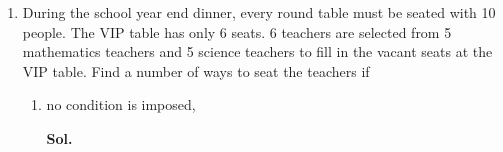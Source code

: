 \documentclass{report}
\newcommand\comb[2][^n]{{}_{#1}C_{#2}}
\newcommand{\sol}[1]{

      \noindent \textbf{Sol.}
}
\def\eos{\quad\hbox{\rlap{\hbox{\vrule depth 1.5pt height 2.6mm width 0.2mm \hskip 1mm \vrule height 2.6mm width 0.2mm}}{\vbox{\hrule height 0.2mm width 1.4mm \vskip 2.8mm \hrule depth 1.5pt height -0.35mm width 1.2mm}}}}
\begin{document}
\begin{multicols*}{2}
\begin{enumerate}
\begin{enumerate}
                              Choose 7 students from 17 students. There are $\comb[17]{7} = 19\,448$ ways to
                              do so. $\eos$

                        \item there are 3 male students and 4 female students. \sol{}

                              Choose 3 male students from 7 male students, there are $\comb[7]{3} = 35$ ways
                              to do so.

                              Choose 4 female students from 10 female students, there are $\comb[10]{4} =
                                    210$ ways to do so.

                              Hence, there are $35 \times 210 = 7\,350$ ways to form the committee. $\eos$

                        \item  The number of female students must be more than the number of male students.
                              \sol{}

                              According to the condition imposed, the team in which the number of female
                              students is less than or equal to the number of male students is not allowed.

                              Choose 5 male students and 5 female students, there are $\comb[7]{5} \times
                                    \comb[10]{5} = 5\,292$ ways to do so.

                              Choose 6 male students and 4 female students, there are $\comb[7]{6} \times
                                    \comb[10]{4} = 1\,470$ ways to do so.

                              Choose 7 male students and 3 female students, there are $\comb[7]{7} \times
                                    \comb[10]{3} = 120$ ways to do so.

                  \end{enumerate}
            \item During the school year end dinner, every round table must be seated with 10
                  people. The VIP table has only 6 seats. 6 teachers are selected from 5
                  mathematics teachers and 5 science teachers to fill in the vacant seats at the
                  VIP table. Find a number of ways to seat the teachers if
                  \begin{enumerate}
                        \item no condition is imposed, \sol{}


\end{enumerate}
\end{enumerate}
\end{multicols*}
\end{document}
